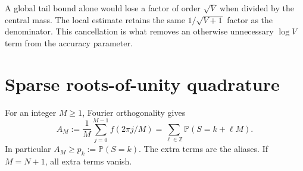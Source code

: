 \documentclass[11pt,a4paper]{article}
\theoremstyle{definition}
\newcommand{\Prob}{\mathbb P}
\newcommand{\Z}{\mathbb Z}
\begin{document}
A global tail bound alone would lose a factor of order $\sqrt V$ when divided by the central mass. The local estimate retains the same $1/\sqrt{V+1}$ factor as the denominator. This cancellation is what removes an otherwise unnecessary $\log V$ term from the accuracy parameter.

\section{Sparse roots-of-unity quadrature}\label{sec:sparse}

For an integer $M\ge1$, Fourier orthogonality gives
\begin{equation}\label{eq:aliasidentity}
 A_M:=\frac1M\sum_{j=0}^{M-1}f(2\pi j/M)
 =\sum_{\ell\in\Z}\Prob(S=k+\ell M).
\end{equation}
In particular $A_M\ge p_k:=\Prob(S=k)$. The extra terms are the aliases. If $M=N+1$, all extra terms vanish.
\end{document}
